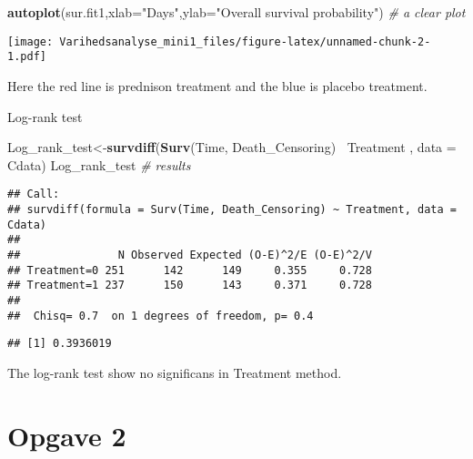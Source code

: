 \documentclass[
]{article}
\newenvironment{Shaded}{\begin{snugshade}}{\end{snugshade}}
\newcommand{\CommentTok}[1]{\textcolor[rgb]{0.56,0.35,0.01}{\textit{#1}}}
\newcommand{\DataTypeTok}[1]{\textcolor[rgb]{0.13,0.29,0.53}{#1}}
\newcommand{\DecValTok}[1]{\textcolor[rgb]{0.00,0.00,0.81}{#1}}
\newcommand{\KeywordTok}[1]{\textcolor[rgb]{0.13,0.29,0.53}{\textbf{#1}}}
\newcommand{\NormalTok}[1]{#1}
\newcommand{\OperatorTok}[1]{\textcolor[rgb]{0.81,0.36,0.00}{\textbf{#1}}}
\newcommand{\StringTok}[1]{\textcolor[rgb]{0.31,0.60,0.02}{#1}}
\begin{document}
\begin{Shaded}
\begin{Highlighting}[]
\KeywordTok{autoplot}\NormalTok{(sur.fit1,}\DataTypeTok{xlab=}\StringTok{"Days"}\NormalTok{,}\DataTypeTok{ylab=}\StringTok{"Overall survival probability"}\NormalTok{) }\CommentTok{# a clear plot}
\end{Highlighting}
\end{Shaded}

\texttt{[image: Varihedsanalyse\_mini1\_files/figure-latex/unnamed-chunk-2-1.pdf]}

Here the red line is prednison treatment and the blue is placebo
treatment.

Log-rank test

\begin{Shaded}
\begin{Highlighting}[]
\NormalTok{Log_rank_test<-}\KeywordTok{survdiff}\NormalTok{(}\KeywordTok{Surv}\NormalTok{(Time, Death_Censoring) }\OperatorTok{~}\NormalTok{Treatment , }\DataTypeTok{data =}\NormalTok{ Cdata)}
\NormalTok{Log_rank_test }\CommentTok{# results}
\end{Highlighting}
\end{Shaded}

\begin{verbatim}
## Call:
## survdiff(formula = Surv(Time, Death_Censoring) ~ Treatment, data = Cdata)
## 
##               N Observed Expected (O-E)^2/E (O-E)^2/V
## Treatment=0 251      142      149     0.355     0.728
## Treatment=1 237      150      143     0.371     0.728
## 
##  Chisq= 0.7  on 1 degrees of freedom, p= 0.4
\end{verbatim}

\begin{Shaded}
\end{Shaded}

\begin{verbatim}
## [1] 0.3936019
\end{verbatim}

The log-rank test show no significans in Treatment method.

\hypertarget{opgave-2}{%
\section{Opgave 2}\label{opgave-2}}
\end{document}
